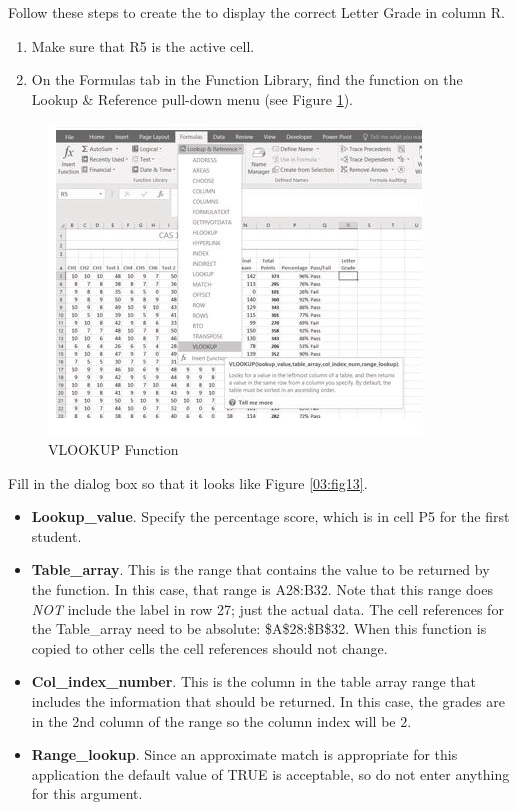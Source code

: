 Follow these steps to create the  to display the correct Letter Grade in column R.

\begin{enumerate}
	\item Make sure that \textsf{R5} is the active cell.
	\item On the Formulas tab in the Function Library, find the  function on the Lookup \& Reference pull-down menu (see Figure \ref{03:fig12}).
\end{enumerate}

\begin{figure}[H]
	\centering
	\includegraphics[width=\maxwidth{.95\linewidth}]{gfx/ch03_fig12}
	\caption{VLOOKUP Function}
	\label{03:fig12}
\end{figure}

Fill in the dialog box so that it looks like Figure \ref{03:fig13}.

\begin{itemize}
	\item \textbf{Lookup\_value}. Specify the percentage score, which is in cell \textsf{P5} for the first student.
	\item \textbf{Table\_array}. This is the range that contains the value to be returned by the function. In this case, that range is \textsf{A28:B32}. Note that this range does \textit{NOT} include the label in row 27; just the actual data. The cell references for the Table\_array need to be absolute: \textsf{\$A\$28:\$B\$32}. When this function is copied to other cells the cell references should not change.
	\item \textbf{Col\_index\_number}. This is the column in the table array range that includes the information that should be returned. In this case, the grades are in the 2nd column of the range so the column index will be $ 2 $.
	\item \textbf{Range\_lookup}. Since an approximate match is appropriate for this application the default value of TRUE is acceptable, so do not enter anything for this argument.
\end{itemize}

